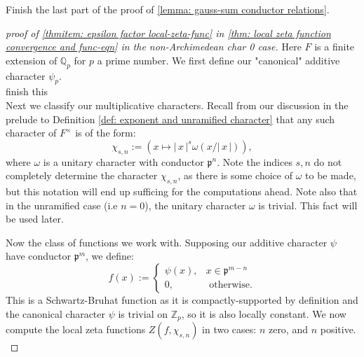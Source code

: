 \documentclass[11pt, x11names]{book}
\newcommand{\zz}{\mathbb{Z}}
\newcommand{\qq}{\mathbb{Q}}
\newcommand{\pp}{\mathfrak{p}}
\renewcommand{\brack}[1]{\left(   #1 \right)}
\newcommand{\abs}[1]{\left| \, #1  \,\right|}
\begin{document}
\begin{exercise}
\label{exercise: last part of gauss-sum conductor proof}
Finish the last part of the proof of \ref{lemma: gauss-sum conductor relations}.
\end{exercise}

\begin{proof}[proof of \ref{thmitem: epsilon factor local-zeta-func} in \ref{thm: local zeta function convergence and func-eqn} in the non-Archimedean char 0 case]
Here $F$ is a finite extension of $\qq_p$ for $p$ a prime number. We first define our "canonical" additive character $\psi_p$.\\
 finish this\\

Next we classify our multiplicative characters. Recall from our discussion in the prelude to Definition \ref{def: exponent and unramified character} that any such character of $F^\times$ is of the form:
\begin{equation*}
    \chi_{s, n} := \brack{x \mapsto \abs{x}^s \omega(x/\abs{x})},
\end{equation*}
where $\omega$ is a unitary character with conductor $\pp^n$. Note the indices $s, n$ do not completely determine the character $\chi_{s, n}$, as there is some choice of $\omega$ to be made, but this notation will end up sufficing for the computations ahead. Note also that in the unramified case (i.e $n=0$), the unitary character $\omega$ is trivial. This fact will be used later.

Now the class of functions we work with. Supposing our additive character $\psi$ have conductor $\pp^m$, we define:
\begin{equation*}
    f(x) := \begin{cases}
        \psi(x), & x \in \pp^{m-n}\\
        0, & \text{ otherwise}.
    \end{cases}
\end{equation*}
This is a Schwartz-Bruhat function as it is compactly-supported by definition and the canonical character $\psi$ is trivial on $\zz_p$, so it is also locally constant. We now compute the local zeta functions $Z(f, \chi_{s, n})$ in two cases: $n$ zero, and $n$ positive.\\


\end{proof}
\end{document}
